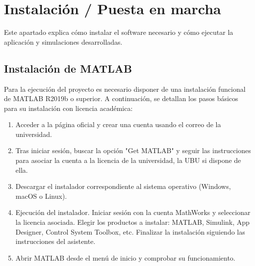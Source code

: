 \begin{table}[H]
\small
\centering
{} %
\caption{Requisitos mínimos y recomendados para la ejecución del proyecto.}
\label{tab:requisitos}
\end{table}



\section{Instalación / Puesta en marcha}
Este apartado explica cómo instalar el software necesario y cómo ejecutar la aplicación y simulaciones desarrolladas.

\subsection{Instalación de MATLAB}
Para la ejecución del proyecto es necesario disponer de una instalación funcional de MATLAB R2019b o superior. A continuación, se detallan los pasos básicos para su instalación con licencia académica:
\begin{enumerate}
    \item Acceder a la página oficial \cite{mathworks_matlab} y crear una cuenta usando el correo de la universidad.
    \item Tras iniciar sesión, buscar la opción "Get MATLAB" y seguir las instrucciones para asociar la cuenta a la licencia de la universidad, la UBU si dispone de ella. 
    \item Descargar el instalador correspondiente al sistema operativo (Windows, macOS o Linux).
    \item Ejecución del instalador. Iniciar sesión con la cuenta MathWorks y seleccionar la licencia asociada. Elegir los productos a instalar: MATLAB, Simulink, App Designer, Control System Toolbox, etc. Finalizar la instalación siguiendo las instrucciones del asistente.
    \item Abrir MATLAB desde el menú de inicio y comprobar su funcionamiento.
\end{enumerate}

